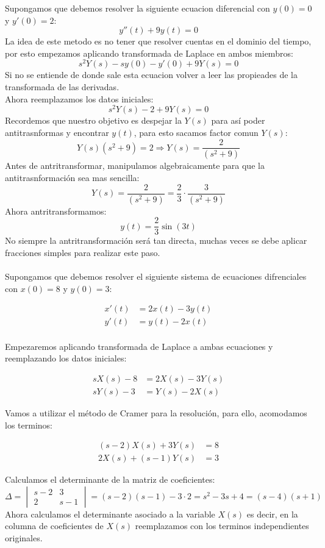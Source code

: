 \documentclass[]{article}
\begin{document}
Supongamos que debemos resolver la siguiente ecuacion diferencial con $y(0) = 0$ y $y'(0)=2$:
$$
y''(t) + 9y(t) = 0
$$
La idea de este metodo es no tener que resolver cuentas en el dominio del tiempo, por esto empezamos aplicando transformada de Laplace en ambos miembros:
$$
s^{2}Y(s)-sy(0)-y'(0)+9Y(s) = 0
$$
Si no se entiende de donde sale esta ecuacion volver a leer las propieades de la transformada de las derivadas.\\
Ahora reemplazamos los datos iniciales:
$$
s^{2}Y(s)-2+9Y(s) = 0
$$
Recordemos que nuestro objetivo es despejar la $Y(s)$ para así poder antitrasnformas y encontrar $y(t)$, para esto sacamos factor comun $Y(s)$:
$$
Y(s)(s^{2}+9) = 2 \Rightarrow Y(s) = \frac{2}{(s^{2}+9)}
$$
Antes de antritransformar, manipulamos algebraicamente para que la antitrasnformación sea mas sencilla:
$$
Y(s) = \frac{2}{(s^{2}+9)} = \frac{2}{3} \cdot  \frac{3}{(s^{2}+9)}
$$
Ahora antritransformamos:
$$
y(t) = \frac{2}{3} \sin(3t)
$$
No siempre la antritransformación será tan directa, muchas veces se debe aplicar fracciones simples para realizar este paso.
\\
\\
Supongamos que debemos resolver el siguiente sistema de ecuaciones difrenciales con $x(0)=8$ y $y(0)=3$:

	\begin{align}
		x'(t)  &= 2x(t)-3y(t) \\
		y'(t) &= y(t) -2x(t)
	\end{align}
\\
Empezaremos aplicando transformada de Laplace a ambas ecuaciones y reemplazando los datos iniciales:

\begin{align}
	sX(s)-8  &= 2X(s)-3Y(s) \\
	sY(s)-3 &= Y(s) -2X(s)
\end{align}

Vamos a utilizar el método de Cramer para la resolución, para ello, acomodamos los terminos:

\begin{align}
	(s-2)X(s) +3Y(s)&= 8 \\
	2X(s)+(s-1)Y(s) &= 3
\end{align}

Calculamos el determinante de la matriz de coeficientes:
$$
\Delta = \begin{vmatrix}
	s-2 & 3\\
	2 & s-1
	\end{vmatrix} = (s-2)(s-1) - 3\cdot 2 = s^{2}-3s+4  = (s-4)(s+1)
$$
Ahora calculamos el determinante asociado a la variable $X(s)$ es decir, en la columna de coeficientes de $X(s)$ reemplazamos con los terminos independientes originales.
\end{document}

